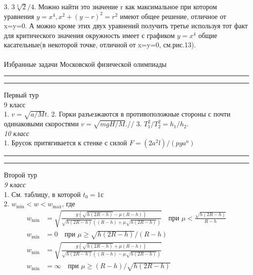 
\begin{multicols}{2}\small
	3. \(3\sqrt[3]{2}/4\). Можно найти это значение r как максимальное при котором уравнения \(y = x^4, x^2 + (y-r)^2=r^2\) имеют общее решение, отличное от x=y=0. А можно кроме этих двух уравнений получить третье используя тот факт для критического значения окружность имеет с графиком \(y = x^4\) общие касательные(в некоторой точке, отличной от x=y=0, см.рис.13).\\\\
	Избранные задачи Московской физической олимпиады\\
	\vspace{-0.3mm}\rule{\linewidth}{0.3mm}
	\rule{\linewidth}{0.3mm}\vspace{-0.5cm}
	Первый тур\\
	9 класс\\
	1. \(v = \sqrt{a/M}t.\) 2. Горки разъезжаются в противоположные стороны с почти одинаковыми скоростями \(v = \sqrt{mgH/M}\).//
	3. \(T^2_1/T^2_2 = h_1/h_2.\)\\
	\textit{10 класс}\\
	1. Брусок притягивается к стенке с силой \(F = (2a^2l)/(pga^a)\)\\
	\columnbreak\newline
	\vspace{-0.3mm}\rule{\linewidth}{0.3mm}
	\rule{\linewidth}{0.3mm}\vspace{-0.5cm}
	Второй тур\\
	\textit{9 класс}\\
	1. См. таблицу, в которой \(t_0 = 1 с\)\\
	2. \(w_\mathrm{min} < w < w_\mathrm{max}\), где\\
	\vspace{-0.2cm}\fontsize{6}{8}\begin{align*}
		w_\mathrm{min} &= \sqrt{\frac{g\left(\sqrt{h\left(2R - h\right)}-\mu\left(R-h\right)\right)}{\sqrt{h\left(2R-h\right)}\left(\left(R-h\right)+\mu\sqrt{h\left(2R-h\right)}\right)}} \quad \text{при } \mu<\frac{\sqrt{h\left(2R-h\right)}}{R-h}\\
		w_\mathrm{min} &= 0 \quad \text{при } \mu \geq\sqrt{h\left(2R-h\right)}/\left(R-h\right)\\
		w_\mathrm{min} &= \sqrt{\frac{g\left(\sqrt{h\left(2R-h\right)}+\mu\left(R-h\right)\right)}{\sqrt{h\left(2R-h\right)}\left(\left(R-h\right)-\mu\sqrt{h\left(2R-h\right)}\right)}}\\
		w_\mathrm{min} &= \infty \quad \text{при } \mu\geq(R-h)/\sqrt{h(2R-h)}
	\end{align*}
\end{multicols}
